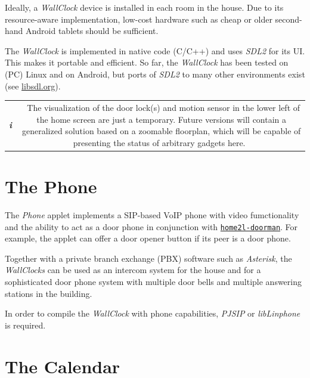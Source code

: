 \documentclass[12pt,english,parskip=half]{scrreprt}
\newcommand{\infobox}[1]{
  \hfill
  \setlength\arrayrulewidth{1pt}
  \begin{tabular}[t]{c|c|}
    \parbox{1.8em}{\hfill\textit{\Huge\textbf{i}\,}}
    &
    \,\parbox{0.89\linewidth}{\setlength{\parskip}{0.5em}#1}\,
  \end{tabular}
  \par
}
\newcommand{\idx}[1]{#1\index{#1}}
\newcommand{\toolref}[1]{\hyperref[tool:#1]{\texttt{\idx{#1}}}}
\begin{document}
Ideally, a \emph{WallClock} device is installed in each room in the
house. Due to its resource-aware implementation, low-cost hardware
such as cheap or older second-hand Android tablets should be sufficient.

The \emph{WallClock} is implemented in native code (C/C++) and uses \emph{SDL2} for its UI. 
This makes it portable and efficient. So far, the \emph{WallClock} has been tested on 
(PC) Linux and on Android, but ports of \emph{SDL2} to many other environments exist 
(see \url{libsdl.org}).

\infobox{
  The visualization of the door lock(s) and motion sensor in the lower
  left of the home screen are just a temporary. Future versions will
  contain a generalized solution based on a zoomable floorplan,
  which will be capable of presenting the status of arbitrary gadgets here.
}





\section{The Phone}
\label{sec:wallclock-phone}


The \emph{Phone} applet implements a SIP-based VoIP phone with video
fumctionality and the ability to act as a door phone in conjunction 
with \toolref{home2l-doorman}. For example, the applet can offer a door 
opener button if its peer is a door phone.

Together with a private branch exchange (PBX) software such as
\emph{Asterisk}, the \emph{WallClocks} can be used as an intercom
system for the house and for a sophisticated door phone system with
multiple door bells and multiple answering stations in the building.

In order to compile the \emph{WallClock} with phone capabilities,
\emph{PJSIP} or \emph{libLinphone} is required.





\section{The Calendar}
\label{sec:wallclock-calendar}
\end{document}
